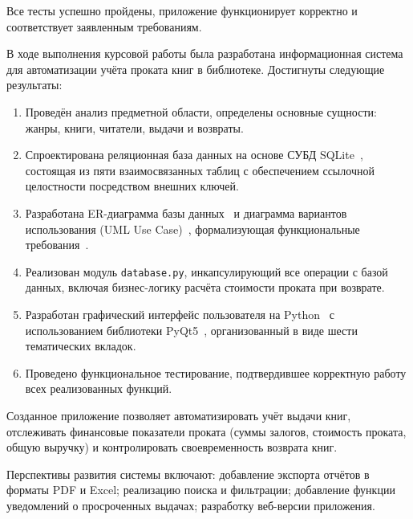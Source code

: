 \documentclass[14pt]{extreport}
\begin{document}
	Все тесты успешно пройдены, приложение функционирует корректно и соответствует заявленным требованиям.
	
	\conclusions
	
	В ходе выполнения курсовой работы была разработана информационная система для автоматизации учёта проката книг в библиотеке. Достигнуты следующие результаты:
	
	\begin{enumerate}
		\item Проведён анализ предметной области, определены основные сущности: жанры, книги, читатели, выдачи и возвраты.
		\item Спроектирована реляционная база данных на основе СУБД SQLite~\cite{bib2,bib8}, состоящая из пяти взаимосвязанных таблиц с обеспечением ссылочной целостности посредством внешних ключей.
		\item Разработана ER-диаграмма базы данных~\cite{bib4} и диаграмма вариантов использования (UML Use Case)~\cite{bib3}, формализующая функциональные требования~\cite{bib9}.
		\item Реализован модуль \texttt{database.py}, инкапсулирующий все операции с базой данных, включая бизнес-логику расчёта стоимости проката при возврате.
		\item Разработан графический интерфейс пользователя на Python~\cite{bib6,bib10} с использованием библиотеки PyQt5~\cite{bib5}, организованный в виде шести тематических вкладок.
		\item Проведено функциональное тестирование, подтвердившее корректную работу всех реализованных функций.
	\end{enumerate}
	
	Созданное приложение позволяет автоматизировать учёт выдачи книг, отслеживать финансовые показатели проката (суммы залогов, стоимость проката, общую выручку) и контролировать своевременность возврата книг.
	
	Перспективы развития системы включают: добавление экспорта отчётов в форматы PDF и Excel; реализацию поиска и фильтрации; добавление функции уведомлений о просроченных выдачах; разработку веб-версии приложения.
\end{document}
